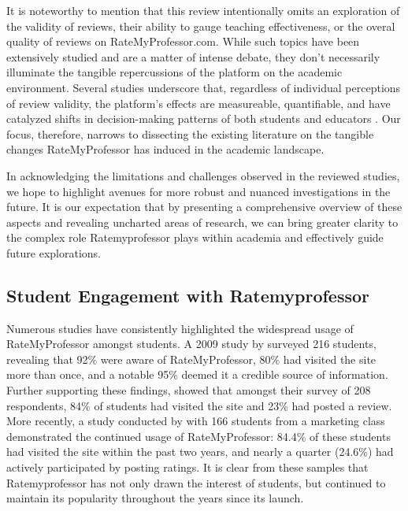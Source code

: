 \documentclass[man, 12pt]{apa7}
\begin{document}
It is noteworthy to mention that this review intentionally omits an exploration of the validity of reviews, their ability to gauge teaching effectiveness, or the overal quality of reviews on RateMyProfessor.com. While such topics have been extensively studied and are a matter of intense debate, they don't necessarily illuminate the tangible repercussions of the platform on the academic environment. Several studies underscore that, regardless of individual perceptions of review validity, the platform's effects are measureable, quantifiable, and have catalyzed shifts in decision-making patterns of both students and educators \textcite{boswell_ratemyprofessors_2016, johnson_i_2014, boswell_effects_2020}. Our focus, therefore, narrows to dissecting the existing literature on the tangible changes RateMyProfessor has induced in the academic landscape.

In acknowledging the limitations and challenges observed in the reviewed studies, we hope to highlight avenues for more robust and nuanced investigations in the future. It is our expectation that by presenting a comprehensive overview of these aspects and revealing uncharted areas of research, we can bring greater clarity to the complex role Ratemyprofessor plays within academia and effectively guide future explorations.

\subsection{Student Engagement with Ratemyprofessor}
Numerous studies have consistently highlighted the widespread usage of RateMyProfessor amongst students. A 2009 study by \textcite{davison_how_2009} surveyed 216 students, revealing that 92\% were aware of RateMyProfessor, 80\% had visited the site more than once, and a notable 95\% deemed it a credible source of information. Further supporting these findings, \textcite{bleske-rechek_ratemyprofessors_2010} showed that amongst their survey of 208 respondents, 84\% of students had visited the site and 23\% had posted a review. More recently, a study conducted by \textcite{chiang_students_2017} with 166 students from a marketing class demonstrated the continued usage of RateMyProfessor: 84.4\% of these students had visited the site within the past two years, and nearly a quarter (24.6\%) had actively participated by posting ratings. It is clear from these samples that Ratemyprofessor has not only drawn the interest of students, but continued to maintain its popularity throughout the years since its launch.
\end{document}
